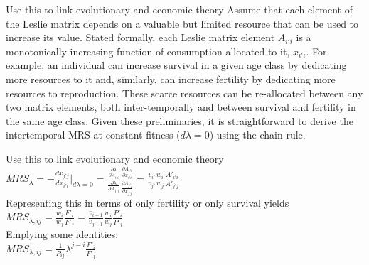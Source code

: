 \documentclass{beamer}
\begin{document}
\begin{frame}{Use this to link evolutionary and economic theory}
Assume that each element of the Leslie matrix depends on a valuable but limited resource that can be used to increase its value. Stated formally, each Leslie matrix element $A_{i'i}$ is a monotonically increasing function of consumption allocated to it, $x_{i'i}$. For example, an individual can increase survival in a given age class by dedicating more resources to it and, similarly, can increase fertility by dedicating more resources to reproduction. These scarce resources can be re-allocated between any two matrix elements, both inter-temporally and between survival and fertility in the same age class. Given these preliminaries, it is straightforward to derive the intertemporal MRS at constant fitness ($d\lambda=0$) using the chain rule. 
\end{frame}

\begin{frame}{Use this to link evolutionary and economic theory}
  $MRS_{\lambda} = -\frac{dx_{j'j}}{dx_{i'i}}\bigg|_{d\lambda=0} = \frac{\frac{\partial \lambda}{\partial A_{i'i}}}{\frac{\partial \lambda}{\partial A_{j'j}}} \frac{\frac{\partial A_{i'i}}{\partial x_{i'i}}}{\frac{\partial A_{j'j}}{\partial x_{j'j}}} = \frac{v_{i'} \, w_i}{v_{j'} \, w_j} \frac{A'_{i'i}}{A'_{j'j}}$\\
  \vspace{.5cm}
  Representing this in terms of only fertility or only survival yields\\
  \vspace{.5cm}
  $MRS_{\lambda,ij} = \frac{w_i}{w_j} \frac{F'_i}{F'_j} = \frac{v_{i+1}}{v_{j+1}} \frac{w_i}{w_j} \frac{P'_i}{P'_j}$\\
  \vspace{.5cm}
  Emplying some identities:\\
  \vspace{.5cm}
  $MRS_{\lambda,ij} = \frac{1}{P_{ij}} \lambda^{j-i} \frac{F'_i}{F'_j}$
\end{frame}
\end{document}
